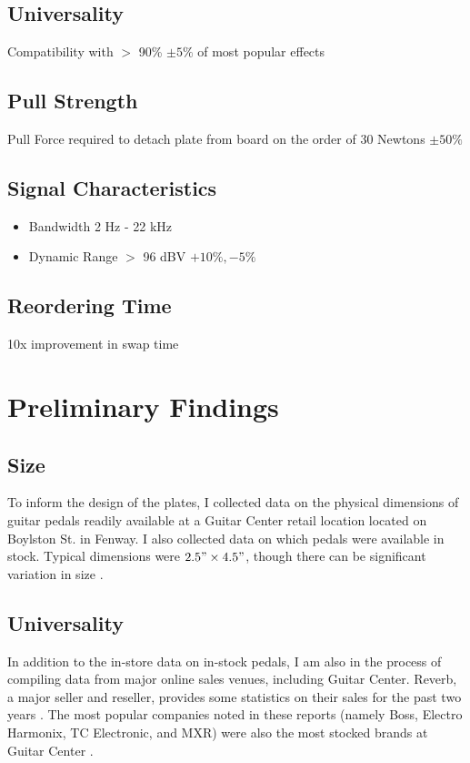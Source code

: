 \documentclass{article}
\begin{document}
	\subsection{Universality}
	Compatibility with $>$ 90\% $\pm 5\%$ of most popular effects

	\subsection{Pull Strength}
	Pull Force required to detach plate from board on the order of 30 Newtons $\pm 50\%$

	\subsection{Signal Characteristics}
		\begin{itemize}
			\item Bandwidth 2 Hz - 22 kHz
			\item Dynamic Range $>$ 96 dBV $+ 10\%, - 5\%$
		\end{itemize}

	\subsection{Reordering Time}
	10x improvement in swap time



\section{Preliminary Findings}
	\subsection{Size}
	To inform the design of the plates, I collected data on the physical dimensions of guitar pedals readily available at a Guitar Center retail location located on Boylston St. in Fenway.  I also collected data on which pedals were available in stock.  Typical dimensions were $2.5" \times 4.5"$, though there can be significant variation in size \cite{MyPedalData}.

	\subsection{Universality}
	In addition to the in-store data on in-stock pedals, I am also in the process of compiling data from major online sales venues, including Guitar Center.  Reverb, a major seller and reseller, provides some statistics on their sales for the past two years \cite{ReverbMostPopular}.  The most popular companies noted in these reports (namely Boss, Electro Harmonix, TC Electronic, and MXR) were also the most stocked brands at Guitar Center \cite{MyPedalData}.
\end{document}
